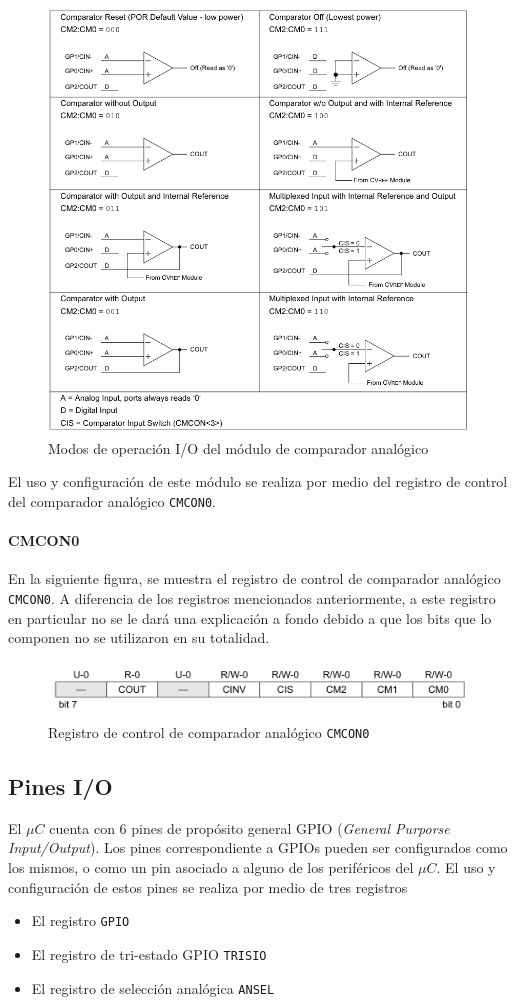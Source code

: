 \begin{figure}[!h]
    \centering
    \includegraphics[width = 0.6\linewidth]{imagenes/fig7.png}
    \caption{Modos de operación I/O del módulo de comparador analógico}
    \label{fig7}
\end{figure}

El uso y configuración de este módulo se realiza por medio del registro de control del comparador analógico \texttt{CMCON0}.

\paragraph{CMCON0}

En la siguiente figura, se muestra el registro de control de comparador analógico \texttt{CMCON0}.
A diferencia de los registros mencionados anteriormente, a este registro en particular no se le dará una explicación a fondo debido a que los bits que lo componen no se utilizaron en su totalidad.

\begin{figure}[!h]
    \centering
    \includegraphics[width = 0.8\linewidth]{imagenes/fig6.png}
    \caption{Registro de control de comparador analógico \texttt{CMCON0}}
    \label{fig66}
\end{figure}

\subsection{Pines I/O}

El $\mu C$ cuenta con 6 pines de propósito general GPIO (\textit{General Purporse Input/Output}).
Los pines correspondiente a GPIOs pueden ser configurados como los mismos, o como un pin asociado a alguno de los periféricos del $\mu C$.  
El uso y configuración de estos pines se realiza por medio de tres registros
\begin{itemize}
    \item El registro \texttt{GPIO}
    \item El registro de tri-estado GPIO \texttt{TRISIO}
    \item El registro de selección analógica \texttt{ANSEL}
\end{itemize}

